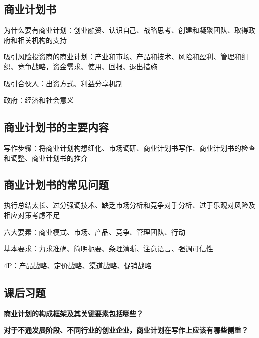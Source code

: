 \documentclass[a4paper, UTF8]{ctexart}
\begin{document}
	\subsection{商业计划书}
		为什么要有商业计划：创业融资、认识自己、战略思考、创建和凝聚团队、取得政府和相关机构的支持

		吸引风险投资商的商业计划：产业和市场、产品和技术、风险和盈利、管理和组织、竞争战略，资金需求、使用、回报、退出措施

		吸引合伙人：出资方式、利益分享机制

		政府：经济和社会意义

	\subsection{商业计划书的主要内容}
		写作步骤：将商业计划构想细化、市场调研、商业计划书写作、商业计划书的检查和调整、商业计划书的推介

	\subsection{商业计划书的常见问题}
		执行总结太长、过分强调技术、缺乏市场分析和竞争对手分析、过于乐观对风险及相应对策考虑不足

		六大要素：商业模式、市场、产品、竞争、管理团队、行动

		基本要求：力求准确、简明扼要、条理清晰、注意语言、强调可信性

		4P：产品战略、定价战略、渠道战略、促销战略
	\subsection{课后习题}
		\textbf{商业计划的构成框架及其关键要素包括哪些？}

		\textbf{对于不通发展阶段、不同行业的创业企业，商业计划在写作上应该有哪些侧重？}
\end{document}

